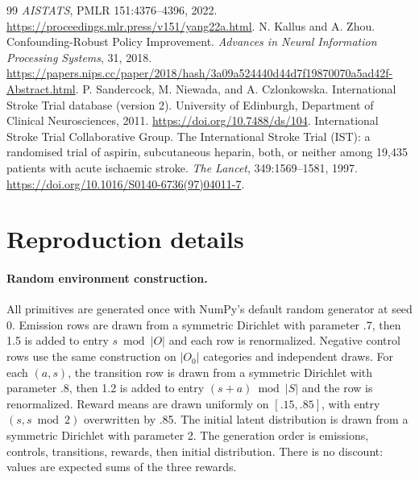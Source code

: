 \documentclass[11pt]{article}
\begin{document}
\begin{thebibliography}{99}
\emph{AISTATS}, PMLR 151:4376--4396, 2022.
\url{https://proceedings.mlr.press/v151/yang22a.html}.
 N. Kallus and A. Zhou.
Confounding-Robust Policy Improvement.
\emph{Advances in Neural Information Processing Systems}, 31, 2018.
\url{https://papers.nips.cc/paper/2018/hash/3a09a524440d44d7f19870070a5ad42f-Abstract.html}.
 P. Sandercock, M. Niewada, and A. Czlonkowska.
International Stroke Trial database (version 2). University of Edinburgh,
Department of Clinical Neurosciences, 2011.
\url{https://doi.org/10.7488/ds/104}.
 International Stroke Trial Collaborative Group.
The International Stroke Trial (IST): a randomised trial of aspirin,
subcutaneous heparin, both, or neither among 19,435 patients with acute
ischaemic stroke. \emph{The Lancet}, 349:1569--1581, 1997.
\url{https://doi.org/10.1016/S0140-6736(97)04011-7}.
\end{thebibliography}

\appendix
\section{Reproduction details}
\label{app:reproduction}
\paragraph{Random environment construction.}
All primitives are generated once with NumPy's default random generator at
seed 0. Emission rows are drawn from a symmetric Dirichlet with parameter .7,
then 1.5 is added to entry $s\bmod |O|$ and each row is renormalized. Negative
control rows use the same construction on $|O_0|$ categories and independent
draws. For each $(a,s)$, the transition row is drawn from a symmetric Dirichlet
with parameter .8, then 1.2 is added to entry $(s+a)\bmod |S|$ and the row is
renormalized. Reward means are drawn uniformly on $[.15,.85]$, with entry
$(s,s\bmod2)$ overwritten by .85. The initial latent distribution is drawn
from a symmetric Dirichlet with parameter 2. The generation order is emissions,
controls, transitions, rewards, then initial distribution. There is no discount:
values are expected sums of the three rewards.
\end{document}
